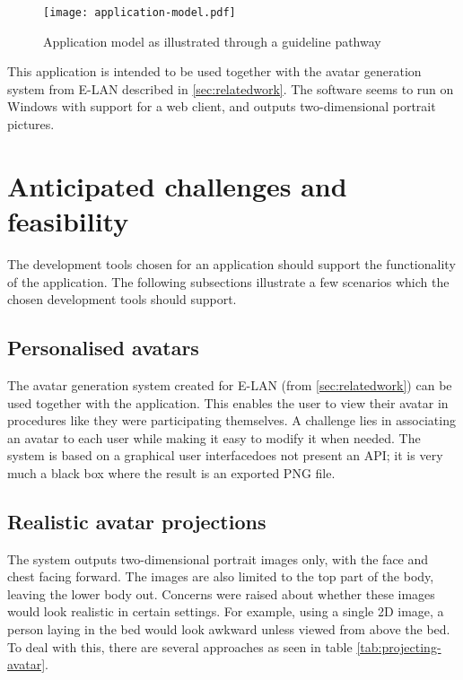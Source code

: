 \begin{figure}
    \centering
    \texttt{[image: application-model.pdf]}
    \caption{Application model as illustrated through a guideline pathway}
    \label{fig:applicationmodel}
\end{figure}

This application is intended to be used together with the avatar generation system from E-LAN described in \cref{sec:relatedwork}.
The software seems to run on Windows with support for a web client, and outputs two-dimensional portrait pictures.

\section{Anticipated challenges and feasibility}

The development tools chosen for an application should support the functionality of the application. The following subsections illustrate a few scenarios which the chosen development tools should support.

\subsection{Personalised avatars}

The avatar generation system created for E-LAN (from \ref{sec:relatedwork}) can be used together with the application. This enables the user to view their avatar in procedures like they were participating themselves. A challenge lies in associating an avatar to each user while making it easy to modify it when needed. The system is based on a graphical user interfacedoes not present an API; it is very much a black box where the result is an exported PNG file.

\subsection{Realistic avatar projections}

The system outputs two-dimensional portrait images only, with the face and chest facing forward. The images are also limited to the top part of the body, leaving the lower body out. Concerns were raised about whether these images would look realistic in certain settings. For example, using a single 2D image, a person laying in the bed would look awkward unless viewed from above the bed. To deal with this, there are several approaches as seen in table \ref{tab:projecting-avatar}.

